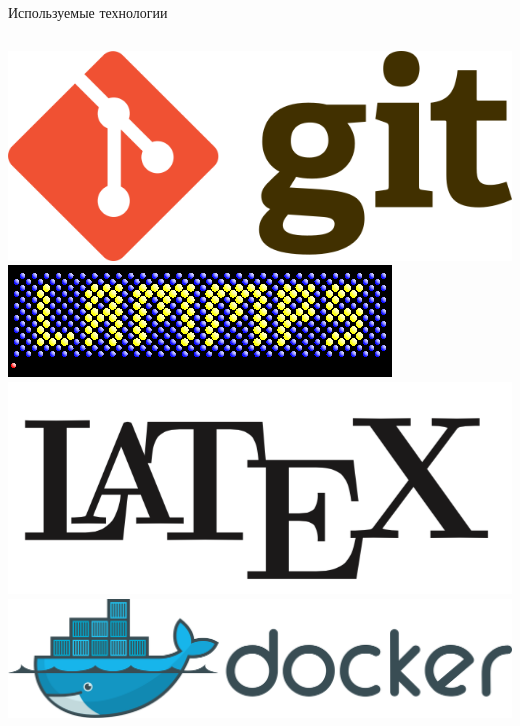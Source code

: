 \documentclass{beamer} %
\begin{document}
\begin{frame}{Используемые технологии}

  \begin{columns}
    \begin{column}{0.3\linewidth}
      \begin{center}
        \includegraphics[width=\textwidth]{git_logo.png}
        \includegraphics[width=\textwidth]{lammps_logo.png}
        \includegraphics[width=\textwidth]{latex_logo.png}
        \includegraphics[width=\textwidth]{docker_logo.png}
      \end{center}
    \end{column}


\end{columns}
\end{frame}
\end{document}
